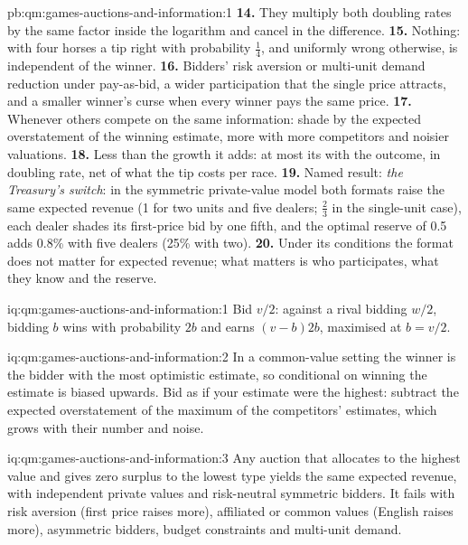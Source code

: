 \begin{solution}{pb:qm:games-auctions-and-information:1}
\textbf{14.} They multiply both doubling rates by the same factor inside the logarithm and cancel in the difference.
\textbf{15.} Nothing: with four horses a tip right with probability $\frac14$, and uniformly wrong otherwise, is independent of the winner.
\textbf{16.} Bidders' risk aversion or multi-unit demand reduction under pay-as-bid, a wider participation that the single price attracts, and a smaller winner's curse when every winner pays the same price.
\textbf{17.} Whenever others compete on the same information: shade by the expected overstatement of the winning estimate, more with more competitors and noisier valuations.
\textbf{18.} Less than the growth it adds: at most its  with the outcome, in doubling rate, net of what the tip costs per race.
\textbf{19.} Named result: \emph{the Treasury's switch}: in the symmetric private-value model both formats raise the same expected revenue (1 for two units and five dealers; $\frac23$ in the single-unit case), each dealer
shades its first-price bid by one fifth, and the optimal reserve of 0.5 adds 0.8\% with five dealers (25\% with two).
\textbf{20.} Under its conditions the format does not matter for expected revenue; what matters is who participates, what they know and the reserve.
\end{solution}

\begin{solution}{iq:qm:games-auctions-and-information:1}
Bid $v/2$: against a rival bidding $w/2$, bidding $b$ wins with probability $2b$ and earns $(v - b)2b$, maximised at $b = v/2$.
\end{solution}

\begin{solution}{iq:qm:games-auctions-and-information:2}
In a common-value setting the winner is the bidder with the most optimistic estimate, so conditional on winning the estimate is biased upwards. Bid as if your estimate were the highest: subtract the
expected overstatement of the maximum of the competitors' estimates, which grows with their number and noise.
\end{solution}

\begin{solution}{iq:qm:games-auctions-and-information:3}
Any auction that allocates to the highest value and gives zero surplus to the lowest type yields the same expected revenue, with independent private values and risk-neutral symmetric bidders. It fails with
risk aversion (first price raises more), affiliated or common values (English raises more), asymmetric bidders, budget constraints and multi-unit demand.
\end{solution}

